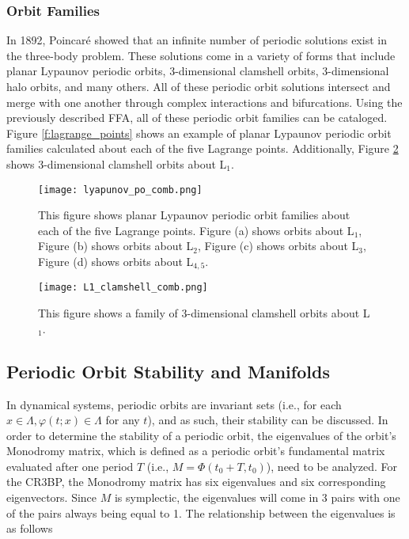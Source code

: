 \documentclass[11pt]{article} %
\begin{document}
\subsubsection{Orbit Families}
In 1892, Poincar\'{e} showed that an infinite number of periodic solutions exist in the three-body problem. These solutions come in a variety of forms that include planar Lypaunov periodic orbits, 3-dimensional clamshell orbits, 3-dimensional halo orbits, and many others. All of these periodic orbit solutions intersect and merge with one another through complex interactions and bifurcations. Using the previously described FFA, all of these periodic orbit families can be cataloged. Figure \ref{f:lagrange_points} shows an example of planar Lypaunov periodic orbit families calculated about each of the five Lagrange points. Additionally, Figure \ref{f:clamshell_po} shows 3-dimensional clamshell orbits about L$_1$. 

\begin{figure}[H]
    \centering
    \texttt{[image: lyapunov\_po\_comb.png]}
    \caption{This figure shows planar Lypaunov periodic orbit families about each of the five Lagrange points. Figure (a) shows orbits about L$_1$, Figure (b) shows orbits about L$_2$, Figure (c) shows orbits about L$_3$, Figure (d) shows orbits about L$_{4,5}$.}
    \label{f:lyapunov_po}
\end{figure}

\begin{figure}[H]
    \centering
    \texttt{[image: L1\_clamshell\_comb.png]}
    \caption{This figure shows a family of 3-dimensional clamshell orbits about L$_1$.}
    \label{f:clamshell_po}
\end{figure}


\subsection{Periodic Orbit Stability and Manifolds}
In dynamical systems, periodic orbits are invariant sets (i.e., for each $x \in \Lambda, \varphi\left(t;x\right)\in\Lambda$ for any $t$), and as such, their stability can be discussed. In order to determine the stability of a periodic orbit, the eigenvalues of the orbit's Monodromy matrix, which is defined as a periodic orbit's fundamental matrix evaluated after one period $T$ (i.e., $M=\Phi\left(t_0+T,t_0\right)$), need to be analyzed. For the CR3BP, the Monodromy matrix has six eigenvalues and six corresponding eigenvectors. Since $M$ is symplectic, the eigenvalues will come in 3 pairs with one of the pairs always being equal to 1. The relationship between the eigenvalues is as follows
\end{document}
